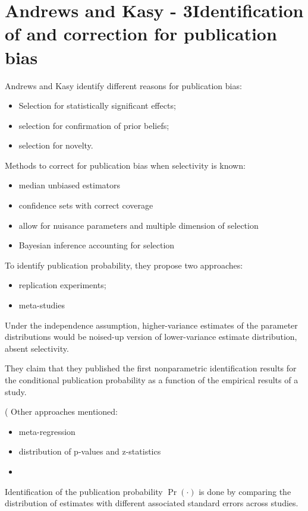 \section{Andrews and Kasy - 3Identification of and correction for publication bias}
Andrews and Kasy identify different reasons for publication bias:
\begin{itemize}
    \item Selection for statistically significant effects;
    \item selection for confirmation of prior beliefs;
    \item selection for novelty.
\end{itemize}
Methods to correct for publication bias when selectivity is known:
\begin{itemize}
    \item median unbiased estimators
    \item confidence sets with correct coverage
    \item allow for nuisance parameters and multiple dimension of selection
    \item Bayesian inference accounting for selection
\end{itemize}
To identify publication probability, they propose two approaches: 
\begin{itemize}
    \item replication experiments;
    \item meta-studies
\end{itemize}
Under the independence assumption, higher-variance estimates of the parameter distributions would be noised-up version of lower-variance estimate distribution, absent selectivity.\par
They claim that they published the first nonparametric identification results for the conditional publication probability as a function of the empirical results of a study.\par (%
Other approaches mentioned: 
\begin{itemize}
    \item meta-regression
    \item distribution of p-values and z-statistics
    \item 
\end{itemize}
Identification of the publication probability $\Pr(\cdot)$ is done by comparing the distribution of estimates with different associated standard errors across studies.

